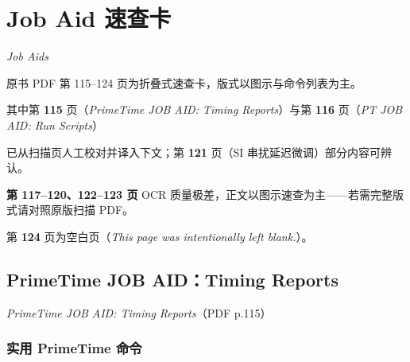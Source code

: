 
\chapter{Job Aid 速查卡}

\label{app:job-aids}



\noindent\textit{Job Aids}



\begin{noteBox}

原书 PDF 第 115--124 页为折叠式速查卡，版式以图示与命令列表为主。

其中第 \textbf{115} 页（\emph{PrimeTime JOB AID: Timing Reports}）与第 \textbf{116} 页（\emph{PT JOB AID: Run Scripts}）

已从扫描页人工校对并译入下文；第 \textbf{121} 页（SI 串扰延迟微调）部分内容可辨认。

\textbf{第 117--120、122--123 页} OCR 质量极差，正文以图示速查为主——若需完整版式请对照原版扫描 PDF。

第 \textbf{124} 页为空白页（\textit{This page was intentionally left blank.}）。

\end{noteBox}



\section{PrimeTime JOB AID：Timing Reports}

\label{jobaid:timing-reports}



\noindent\textit{PrimeTime JOB AID: Timing Reports}（PDF p.115）



\subsection{实用 PrimeTime 命令}

\label{jobaid:timing-helpful}



